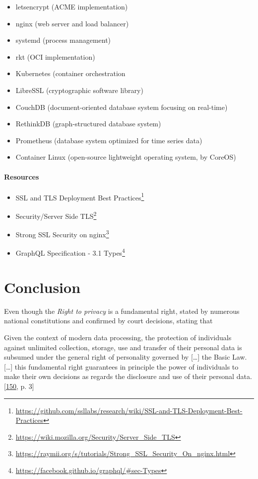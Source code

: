 \documentclass[12pt,english,a4paper,titlepage,cleardoublepage=empty,dottedtoc]{report}
\renewcommand{\href}[2]{#2\footnote{\url{#1}}}
\providecommand{\tightlist}{%
  \setlength{\itemsep}{0pt}\setlength{\parskip}{0pt}}
\let\origquote\quote
\let\endorigquote\endquote
\renewenvironment{quote}{%
    \origquote
    \itshape
}
{\endorigquote}
\begin{document}
\begin{itemize}
\tightlist
\item
  letsencrypt (ACME implementation)
\item
  nginx (web server and load balancer)
\item
  systemd (process management)
\item
  rkt (OCI implementation)
\item
  Kubernetes (container orchestration
\item
  LibreSSL (cryptographic software library)
\item
  CouchDB (document-oriented database system focusing on real-time)
\item
  RethinkDB (graph-structured database system)
\item
  Prometheus (database system optimized for time series data)
\item
  Container Linux (open-source lightweight operating system, by CoreOS)
\end{itemize}

\subsubsection*{Resources}\label{resources}

\begin{itemize}
\tightlist
\item
  \href{https://github.com/ssllabs/research/wiki/SSL-and-TLS-Deployment-Best-Practices}{SSL
  and TLS Deployment Best Practices}
\item
  \href{https://wiki.mozilla.org/Security/Server_Side_TLS}{Security/Server
  Side TLS}
\item
  \href{https://raymii.org/s/tutorials/Strong_SSL_Security_On_nginx.html}{Strong
  SSL Security on nginx}
\item
  \href{https://facebook.github.io/graphql/\#sec-Types}{GraphQL
  Specification - 3.1 Types}
\end{itemize}

\chapter{Conclusion}\label{conclusion}

Even though the \emph{Right to privacy} is a fundamental right, stated
by numerous national constitutions and confirmed by court decisions,
stating that

\begin{quote}
Given the context of modern data processing, the protection of
individuals against unlimited collection, storage, use and transfer of
their personal data is subsumed under the general right of personality
governed by {[}\ldots{}{]} the Basic Law. {[}\ldots{}{]} this
fundamental right guarantees in principle the power of individuals to
make their own decisions as regards the disclosure and use of their
personal data.
{[}\protect\hyperlink{ref-court-decision_1983_census-act-germany}{150},
p. 3{]}
\end{quote}
\end{document}
